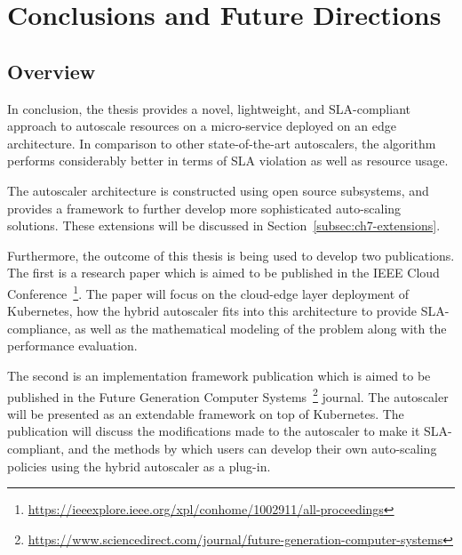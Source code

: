 \clearpage

\def\chaptertitle{Conclusions and Future Directions}

\lhead{\emph{\chaptertitle}}

\chapter{\chaptertitle}
\label{ch:conclusion}

\section{Overview}
\label{sec:ch7-overview}

In conclusion, the thesis provides a novel, lightweight, and SLA-compliant approach to autoscale resources on a micro-service deployed on an edge architecture. In comparison to other state-of-the-art autoscalers, the algorithm performs considerably better in terms of SLA violation as well as resource usage.\par

The autoscaler architecture is constructed using open source subsystems, and provides a framework to further develop more sophisticated auto-scaling solutions. These extensions will be discussed in Section~\ref{subsec:ch7-extensions}.\par

Furthermore, the outcome of this thesis is being used to develop two publications. The first is a research paper which is aimed to be published in the IEEE Cloud Conference~\footnote{\url{https://ieeexplore.ieee.org/xpl/conhome/1002911/all-proceedings}}. The paper will focus on the cloud-edge layer deployment of Kubernetes, how the hybrid autoscaler fits into this architecture to provide SLA-compliance, as well as the mathematical modeling of the problem along with the performance evaluation.\par

The second is an implementation framework publication which is aimed to be published in the Future Generation Computer Systems~\footnote{\url{https://www.sciencedirect.com/journal/future-generation-computer-systems}} journal. The autoscaler will be presented as an extendable framework on top of Kubernetes. The publication will discuss the modifications made to the autoscaler to make it SLA-compliant, and the methods by which users can develop their own auto-scaling policies using the hybrid autoscaler as a plug-in.\par

